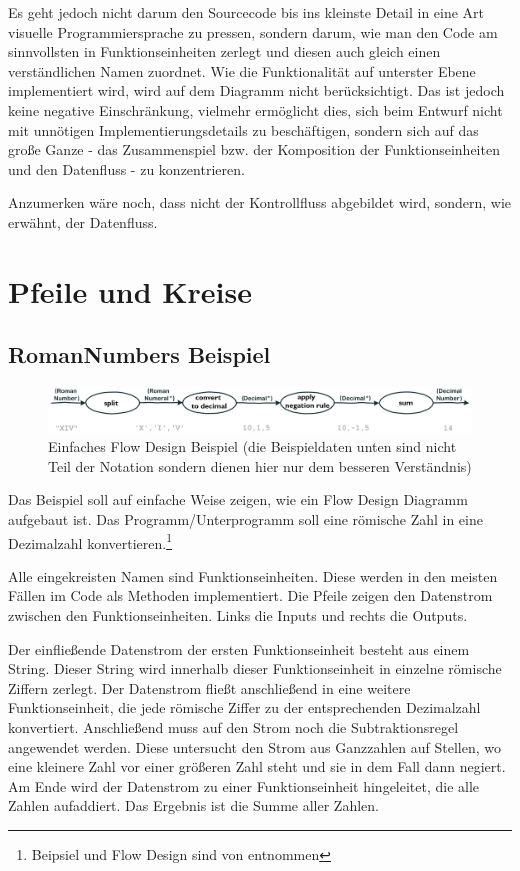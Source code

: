 Es geht jedoch nicht darum den Sourcecode bis ins kleinste Detail in eine Art visuelle Programmiersprache zu pressen,
sondern darum, wie man den Code am sinnvollsten in Funktionseinheiten zerlegt und diesen auch gleich einen verständlichen Namen zuordnet.
Wie die Funktionalität auf unterster Ebene implementiert wird, wird auf dem Diagramm nicht berücksichtigt.
Das ist jedoch keine negative Einschränkung, vielmehr ermöglicht dies, sich beim Entwurf nicht mit unnötigen Implementierungsdetails zu beschäftigen, sondern sich auf das große Ganze - das Zusammenspiel bzw. der Komposition der Funktionseinheiten und den Datenfluss - zu konzentrieren.


Anzumerken wäre noch, dass nicht der Kontrollfluss abgebildet wird, sondern, wie erwähnt, der Datenfluss.


\chapter{Pfeile und Kreise}

\section{RomanNumbers Beispiel}


\begin{figure}[H]
	\centering
	\includegraphics[width=1.0\linewidth]{./img/FromRomanNumerals.png}
	\caption{Einfaches Flow Design Beispiel (die Beispieldaten unten sind nicht Teil der Notation sondern dienen hier nur dem besseren Verständnis)
	}
\end{figure}

Das Beispiel soll auf einfache Weise zeigen, wie ein Flow Design Diagramm aufgebaut ist.
Das Programm/Unterprogramm soll eine römische Zahl in eine Dezimalzahl konvertieren.\footnote{Beipsiel und Flow Design sind von \cite{CODEWHISPERER} entnommen}

Alle eingekreisten Namen sind Funktionseinheiten.
Diese werden in den meisten Fällen im Code als Methoden implementiert.
Die Pfeile zeigen den Datenstrom zwischen den Funktionseinheiten. Links die Inputs und rechts die Outputs.


Der einfließende Datenstrom der ersten Funktionseinheit besteht aus einem String. Dieser String wird innerhalb dieser Funktionseinheit in einzelne römische Ziffern zerlegt.
Der Datenstrom fließt anschließend in eine weitere Funktionseinheit, die jede römische Ziffer zu der entsprechenden Dezimalzahl konvertiert. Anschließend muss auf den Strom noch die Subtraktionsregel angewendet werden. Diese untersucht den
Strom aus Ganzzahlen auf Stellen, wo eine kleinere Zahl vor einer größeren Zahl steht und sie in dem Fall dann negiert.
Am Ende wird der Datenstrom zu einer Funktionseinheit hingeleitet, die alle Zahlen aufaddiert.
Das Ergebnis ist die Summe aller Zahlen.


